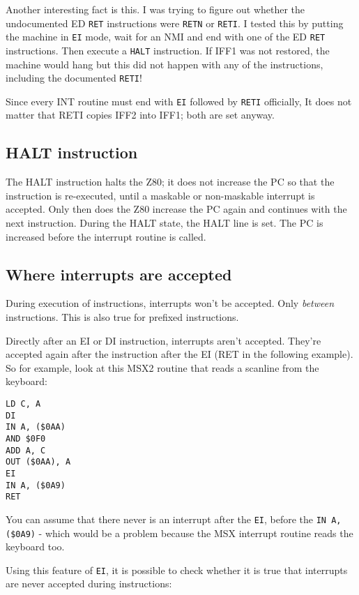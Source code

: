 \documentclass[twoside,openright,a4paper]{book}
\begin{document}
Another interesting fact is this. I was trying to figure out whether the undocumented ED {\tt RET} instructions were {\tt RETN} or {\tt RETI}. I tested this by putting the machine in {\tt EI} mode, wait for an NMI and end with one of the ED {\tt RET} instructions. Then execute a {\tt HALT} instruction. If IFF1 was not restored, the machine would hang but this did not happen with any of the instructions, including the documented {\tt RETI}!

Since every INT routine must end with {\tt EI} followed by {\tt RETI} officially, It does not matter that RETI copies IFF2 into IFF1; both are set anyway.


\subsection{HALT instruction}

The HALT instruction halts the Z80; it does not increase the PC so that the instruction is re-executed, until a maskable or non-maskable interrupt is accepted. Only then does the Z80 increase the PC again and continues with the next instruction. During the HALT state, the HALT line is set. The PC is increased before the interrupt routine is called.


\subsection{Where interrupts are accepted}

During execution of instructions, interrupts won't be accepted. Only {\em between} instructions. This is also true for prefixed instructions.

Directly after an EI or DI instruction, interrupts aren't accepted. They're accepted again after the instruction after the EI (RET in the following example). So for example, look at this MSX2 routine that reads a scanline from the keyboard:

\begin{Verbatim}
LD C, A
DI
IN A, ($0AA)
AND $0F0
ADD A, C
OUT ($0AA), A
EI
IN A, ($0A9)
RET
\end{Verbatim}

You can assume that there never is an interrupt after the {\tt EI}, before the {\tt IN A,(\$0A9)} - which would be a problem because the MSX interrupt routine reads the keyboard too.

Using this feature of {\tt EI}, it is possible to check whether it is true that interrupts are never accepted during instructions:
\end{document}
